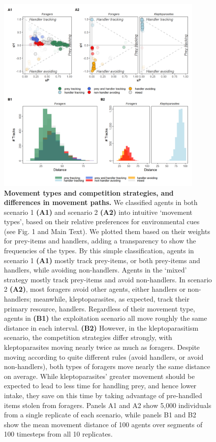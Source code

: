 \begin{figure}[h!]
    \centering
    \includegraphics[width=0.90\textwidth]{figures/patternprocess/fig_02.png}
    \caption{
        \textbf{Movement types and competition strategies, and differences in movement paths.}
        We classified agents in both scenario 1 \textbf{(A1)} and scenario 2 \textbf{(A2)} into intuitive `movement types', based on their relative preferences for environmental cues (see Fig. 1 and Main Text). 
        We plotted them based on their weights for prey-items and handlers, adding a transparency to show the frequencies of the types.
        By this simple classification, agents in scenario 1 \textbf{(A1)} mostly track prey-items, or both prey-items and handlers, while avoiding non-handlers.
        Agents in the `mixed' strategy mostly track prey-items and avoid non-handlers.
        In scenario 2 \textbf{(A2)}, most foragers avoid other agents, either handlers or non-handlers; meanwhile, kleptoparasites, as expected, track their primary resource, handlers.
        Regardless of their movement type, agents in \textbf{(B1)} the exploitation scenario all move roughly the same distance in each interval.
        \textbf{(B2)} However, in the kleptoparasitism scenario, the competition strategies differ strongly, with kleptoparasites moving nearly twice as much as foragers.
        Despite moving according to quite different rules (avoid handlers, or avoid non-handlers), both types of foragers move nearly the same distance on average.
        While kleptoparasites' greater movement should be expected to lead to less time for handling prey, and hence lower intake, they save on this time by taking advantage of pre-handled items stolen from foragers.
        Panels A1 and A2 show 5,000 individuals from a single replicate of each scenario, while panels B1 and B2 show the mean movement distance of 100 agents over segments of 100 timesteps from all 10 replicates.
    }
    \label{fig2}
\end{figure}

